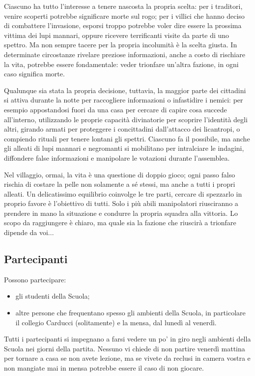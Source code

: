 \documentclass[a4paper,10pt]{article}
\begin{document}
Ciascuno ha tutto l'interesse a tenere nascosta la propria scelta: per i traditori, venire scoperti potrebbe significare morte sul rogo; per i villici che hanno deciso di combattere l'invasione, esporsi troppo potrebbe voler dire essere la prossima vittima dei lupi mannari, oppure ricevere terrificanti visite da parte di uno spettro. Ma non sempre tacere per la propria incolumità è la scelta giusta. In determinate circostanze rivelare preziose informazioni, anche a costo di rischiare la vita, potrebbe essere fondamentale: veder trionfare un'altra fazione, in ogni caso significa morte.

Qualunque sia stata la propria decisione, tuttavia, la maggior parte dei cittadini si attiva durante la notte per raccogliere informazioni o infastidire i nemici: per esempio appostandosi fuori da una casa per cercare di capire cosa succede all'interno, utilizzando le proprie capacità divinatorie per scoprire l'identità degli altri, girando armati per proteggere i concittadini dall'attacco dei licantropi, o compiendo rituali per tenere lontani gli spettri. Ciascuno fa il possibile, ma anche gli alleati di lupi mannari e negromanti si mobilitano per intralciare le indagini, diffondere false informazioni e manipolare le votazioni durante l'assemblea.

Nel villaggio, ormai, la vita è una questione di doppio gioco; ogni passo falso rischia di costare la pelle non solamente a sé stessi, ma anche a tutti i propri alleati. Un delicatissimo equilibrio coinvolge le tre parti, cercare di spezzarlo in proprio favore è l'obiettivo di tutti. Solo i più abili manipolatori riusciranno a prendere in mano la situazione e condurre la propria squadra alla vittoria. Lo scopo da raggiungere è chiaro, ma quale sia la fazione che riuscirà a trionfare dipende da voi...


\subsection{Partecipanti}
Possono partecipare:
\begin{itemize}
 \item gli studenti della Scuola;
 \item altre persone che frequentano spesso gli ambienti della Scuola, in particolare il collegio Carducci (solitamente) e la mensa, dal lunedì al venerdì.
\end{itemize}
Tutti i partecipanti si impegnano a farsi vedere un po' in giro negli ambienti della Scuola nei giorni della partita. Nessuno vi chiede di non partire venerdì mattina per tornare a casa se non avete lezione, ma se vivete da reclusi in camera vostra e non mangiate mai in mensa potrebbe essere il caso di non giocare.
\end{document}

